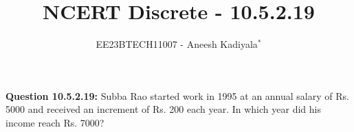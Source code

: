 \documentclass[journal,12pt,twocolumn]{IEEEtran}
\theoremstyle{remark}
\begin{document}

\vspace{3cm}

\title{NCERT Discrete - 10.5.2.19}
\author{EE23BTECH11007 - Aneesh Kadiyala$^{*}$%
}
\maketitle
\newpage
\bigskip

\renewcommand{\thefigure}{\theenumi}
\renewcommand{\thetable}{\theenumi}

\vspace{3cm}
\textbf{Question 10.5.2.19:} Subba Rao started work in 1995 at an annual salary of Rs. 5000 and received an increment of Rs. 200 each year. In which year did his income reach Rs. 7000?
\\
\solution
\end{document}

